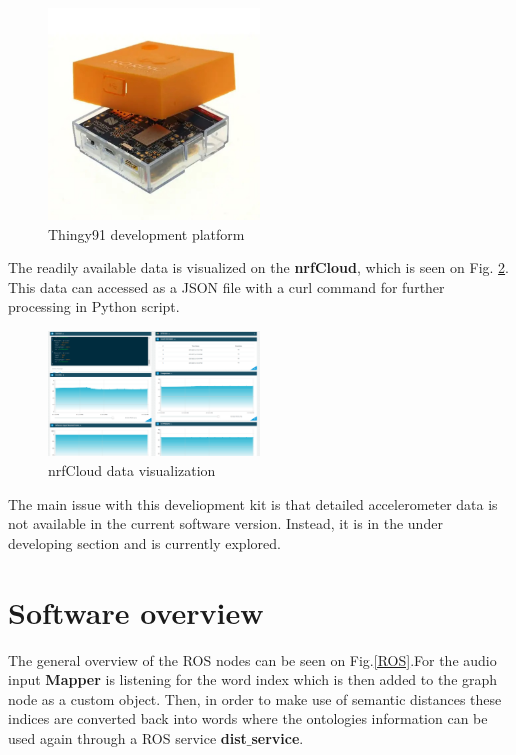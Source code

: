 \documentclass[conference]{IEEEtran}
\begin{document}
\begin{figure}[htbp]
    \centerline{\includegraphics[width=0.5\textwidth,height=0.2\textheight,keepaspectratio]{Pictures/NRF6943.jpg}}
    \caption{Thingy91 development platform}

    \label{thingy_pic}
\end{figure}

The readily available data is visualized on the \textbf{nrfCloud}, which is seen on Fig. \ref{nrfCloud_pic}. This data can accessed as a JSON file with a curl command for further processing in Python script.

\begin{figure}[htbp]
    \centerline{\includegraphics[width=0.5\textwidth,height=0.2\textheight,keepaspectratio]{Pictures/nrfCloud.png}}
    \caption{nrfCloud data visualization}

    \label{nrfCloud_pic}
\end{figure}

The main issue with this develiopment kit is that detailed accelerometer data is not available in the current software version. Instead, it is in the under developing section and is currently explored.

\section{Software overview}

The general overview of the ROS nodes can be seen on Fig.\ref{ROS}.For the audio input \textbf{Mapper} is listening for the word index which is then added to the graph node as a custom object. Then, in order to make use of semantic distances these indices are converted back into words where the ontologies information can be used again through a ROS service \textbf{dist$\_$service}.
\end{document}
